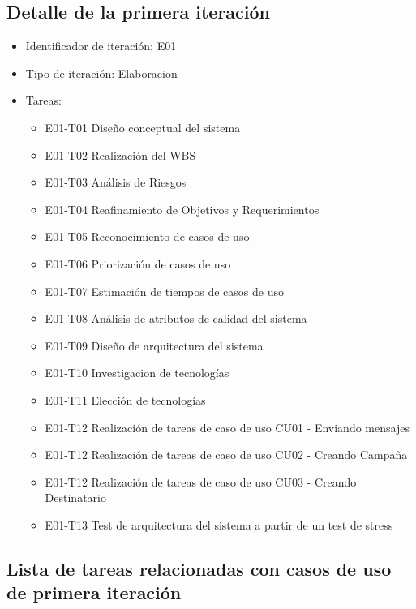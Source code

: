\documentclass[a4paper, 11pt]{article}
\begin{document}
\subsection{Detalle de la primera iteraci\'on}
\begin{itemize}
\item Identificador de iteraci\'on: E01
\item Tipo de iteraci\'on: Elaboracion
\item Tareas:
\begin{itemize}
\item{E01-T01} Diseño conceptual del sistema
\item{E01-T02} Realización del WBS
\item{E01-T03} Análisis de Riesgos
\item{E01-T04} Reafinamiento de Objetivos y Requerimientos
\item{E01-T05} Reconocimiento de casos de uso
\item{E01-T06} Priorizaci\'on de casos de uso 
\item{E01-T07} Estimación de tiempos de casos de uso
\item{E01-T08} Análisis de atributos de calidad del sistema
\item{E01-T09} Diseño de arquitectura del sistema
\item{E01-T10} Investigacion de tecnolog\'ias
\item{E01-T11} Elección de tecnologías
\item{E01-T12} Realización de tareas de caso de uso CU01 - Enviando mensajes
\item{E01-T12} Realización de tareas de caso de uso CU02 - Creando Campa\~na
\item{E01-T12} Realización de tareas de caso de uso CU03 - Creando Destinatario
\item{E01-T13} Test de arquitectura del sistema a partir de un test de stress
\end{itemize}
\end{itemize}

\subsection{Lista de tareas relacionadas con casos de uso de primera iteraci\'on}
\end{document}
